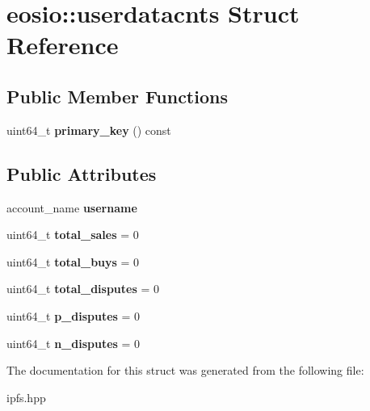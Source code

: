 \hypertarget{structeosio_1_1userdatacnts}{}\section{eosio\+:\+:userdatacnts Struct Reference}
\label{structeosio_1_1userdatacnts}
\subsection*{Public Member Functions}
\begin{DoxyCompactItemize}
\item 
\mbox{\label{structeosio_1_1userdatacnts_a4fc8a474ce6c223ee99cb983248f9e38}} 
uint64\+\_\+t {\bfseries primary\+\_\+key} () const
\end{DoxyCompactItemize}
\subsection*{Public Attributes}
\begin{DoxyCompactItemize}
\item 
\mbox{\label{structeosio_1_1userdatacnts_a2ac06404838ec7df93ceec0234c670ff}} 
account\+\_\+name {\bfseries username}
\item 
\mbox{\label{structeosio_1_1userdatacnts_a3a83d18a66b2b09413fc781a6cf6bf58}} 
uint64\+\_\+t {\bfseries total\+\_\+sales} = 0
\item 
\mbox{\label{structeosio_1_1userdatacnts_a743abf1afd346de99d8ceb8c86f78e54}} 
uint64\+\_\+t {\bfseries total\+\_\+buys} = 0
\item 
\mbox{\label{structeosio_1_1userdatacnts_a45d2a348699d0d67fabbf60cf9d2e3b5}} 
uint64\+\_\+t {\bfseries total\+\_\+disputes} = 0
\item 
\mbox{\label{structeosio_1_1userdatacnts_a252cda88be8dfc344889a9868fdeb744}} 
uint64\+\_\+t {\bfseries p\+\_\+disputes} = 0
\item 
\mbox{\label{structeosio_1_1userdatacnts_a7d2ecd93e666b68ad4dca92c2ab703fd}} 
uint64\+\_\+t {\bfseries n\+\_\+disputes} = 0
\end{DoxyCompactItemize}


The documentation for this struct was generated from the following file\+:\begin{DoxyCompactItemize}
\item 
ipfs.\+hpp\end{DoxyCompactItemize}
